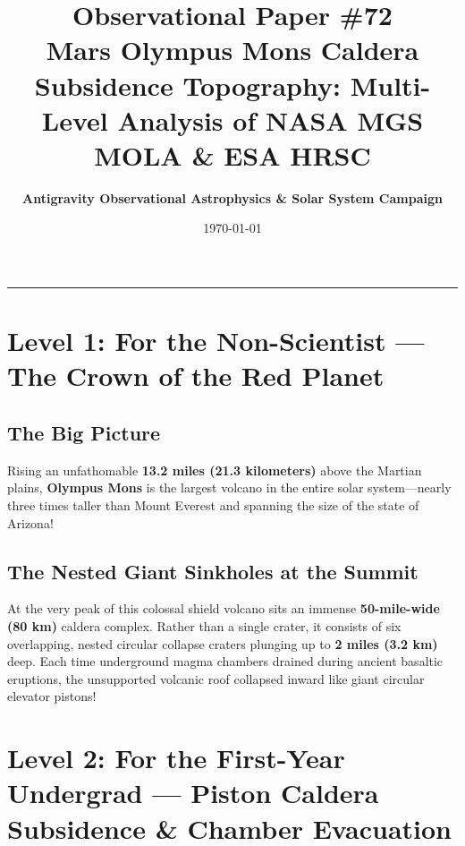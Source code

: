 \documentclass[11pt,a4paper]{article}
\title{\Huge \textbf{Observational Paper \#72}\\ \Large Mars Olympus Mons Caldera Subsidence Topography: Multi-Level Analysis of NASA MGS MOLA \& ESA HRSC}
\author{\textbf{Antigravity Observational Astrophysics \& Solar System Campaign}}
\date{\today}
\begin{document}
\maketitle

\vspace{-1em}
\begin{center}
\rule{\textwidth}{1.5pt}
\end{center}

\section*{Level 1: For the Non-Scientist — The Crown of the Red Planet}

\subsection*{The Big Picture}
Rising an unfathomable \textbf{13.2 miles (21.3 kilometers)} above the Martian plains, \textbf{Olympus Mons} is the largest volcano in the entire solar system—nearly three times taller than Mount Everest and spanning the size of the state of Arizona!

\subsection*{The Nested Giant Sinkholes at the Summit}
At the very peak of this colossal shield volcano sits an immense \textbf{50-mile-wide (80 km)} caldera complex. Rather than a single crater, it consists of six overlapping, nested circular collapse craters plunging up to \textbf{2 miles (3.2 km)} deep. Each time underground magma chambers drained during ancient basaltic eruptions, the unsupported volcanic roof collapsed inward like giant circular elevator pistons!

\newpage

\section*{Level 2: For the First-Year Undergrad — Piston Caldera Subsidence \& Chamber Evacuation}
\end{document}
